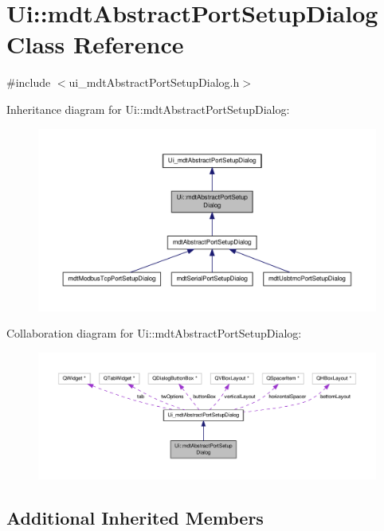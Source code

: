 \hypertarget{class_ui_1_1mdt_abstract_port_setup_dialog}{\section{Ui\-:\-:mdt\-Abstract\-Port\-Setup\-Dialog Class Reference}
\label{class_ui_1_1mdt_abstract_port_setup_dialog}
}


{\ttfamily \#include $<$ui\-\_\-mdt\-Abstract\-Port\-Setup\-Dialog.\-h$>$}



Inheritance diagram for Ui\-:\-:mdt\-Abstract\-Port\-Setup\-Dialog\-:\nopagebreak
\begin{figure}[H]
\begin{center}
\leavevmode
\includegraphics[width=350pt]{class_ui_1_1mdt_abstract_port_setup_dialog__inherit__graph}
\end{center}
\end{figure}


Collaboration diagram for Ui\-:\-:mdt\-Abstract\-Port\-Setup\-Dialog\-:\nopagebreak
\begin{figure}[H]
\begin{center}
\leavevmode
\includegraphics[width=350pt]{class_ui_1_1mdt_abstract_port_setup_dialog__coll__graph}
\end{center}
\end{figure}
\subsection*{Additional Inherited Members}


